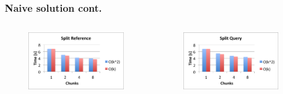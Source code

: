 \documentclass{beamer}
\begin{document}
\begin{frame}
\frametitle{Naive solution cont.}
  \begin{columns}
    \begin{column}{0.5\textwidth}
    \begin{figure}
      \includegraphics[scale=0.5]{ex3.png}
    \end{figure}
  \end{column}
  \begin{column}{0.5\textwidth}
  \begin{figure}
    \includegraphics[scale=0.5]{ex6.png}
  \end{figure}
\end{column}
\end{columns}
\end{frame}
\end{document}
